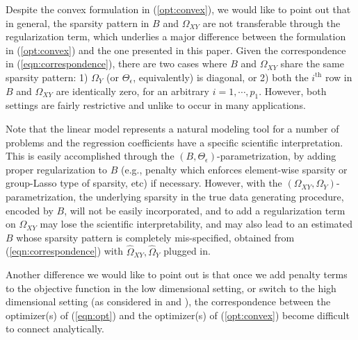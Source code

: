 Despite the convex formulation in (\ref{opt:convex}), we would like to point out that in general, the sparsity pattern in $B$ and $\Omega_{XY}$ are not transferable through the regularization term, which underlies a major difference between the formulation in (\ref{opt:convex}) and the one presented in this paper. Given the correspondence in (\ref{eqn:correspondence}), there are two cases where $B$ and $\Omega_{XY}$ share the same sparsity pattern: 1) $\Omega_{Y}$ (or $\Theta_{\epsilon}$, equivalently) is diagonal, or 2) both the $i^{\text{th}}$ row in $B$ and $\Omega_{XY}$ are identically zero, for an arbitrary $i=1,\cdots,p_1$.  However,
both settings are fairly restrictive and unlike to occur in many applications. 

Note that the linear model represents a natural modeling tool for a number of problems and the regression coefficients have a
specific scientific interpretation. This is easily accomplished through the $(B,\Theta_\epsilon)$-parametrization, by adding 
proper regularization to $B$ (e.g., penalty which enforces element-wise sparsity or group-Lasso type of sparsity, etc) if necessary.
However, with the $(\Omega_{XY},\Omega_Y)$-parametrization, the underlying sparsity in the true data generating procedure, encoded by $B$, will not be easily incorporated, and to add a regularization term on $\Omega_{XY}$ may lose the scientific interpretability, and may also lead to an estimated $B$ whose sparsity pattern is completely mis-specified, obtained from (\ref{eqn:correspondence}) with $\widehat{\Omega}_{XY},\widehat{\Omega}_Y$ plugged in.

Another difference we would like to point out is that once we add penalty terms to the objective function in the low dimensional setting, or switch to the high dimensional setting (as considered in \citet{sohn2012joint} and \citet{yuan2014partial}), the correspondence between the optimizer(s) of (\ref{eqn:opt}) and the optimizer(s) of (\ref{opt:convex}) become difficult
to connect analytically. 